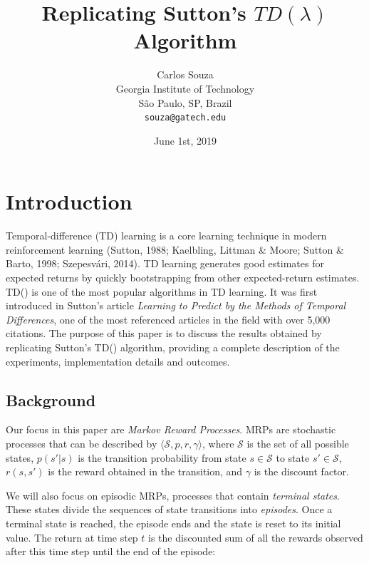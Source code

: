 \documentclass{article}
\title{Replicating Sutton's $TD(\lambda)$ Algorithm}
\date{June 1st, 2019}	%
\author{
  Carlos Souza\\
  Georgia Institute of Technology\\
  São Paulo, SP, Brazil \\
  \texttt{souza@gatech.edu} \\
}
\begin{document}
\maketitle

\begin{abstract}
\lipsum[1]
\end{abstract}




\section{Introduction}
\label{sec:introduction}
Temporal-difference (TD) learning is a core learning technique in modern reinforcement learning  (Sutton, 1988; Kaelbling, Littman \& Moore; Sutton \& Barto, 1998; Szepesvári, 2014).
TD learning generates good estimates for expected returns by quickly bootstrapping from other expected-return estimates. TD(\textlambda) is one of the most popular algorithms in TD learning.
It was first introduced in Sutton's article \emph{Learning to Predict by the Methods of Temporal Differences}, one of the most referenced articles in the field with over 5,000 citations.
The purpose of this paper is to discuss the results obtained by replicating Sutton's TD(\textlambda) algorithm, providing a complete description of the experiments, implementation details and outcomes.

\subsection{Background}
\label{subsec:background}
Our focus in this paper are \emph{Markov Reward Processes}.
MRPs are stochastic processes that can be described by \(\langle\mathcal{S}, p, r, \gamma\rangle\), where \(\mathcal{S}\) is the set of all possible states, \(p(s'|s)\) is the transition probability from state \(s \in \mathcal{S}\) to state \(s' \in \mathcal{S}\), \(r(s, s')\) is the reward obtained in the transition, and \(\gamma\) is the discount factor.

We will also focus on episodic MRPs, processes that contain \emph{terminal states}.
These states divide the sequences of state transitions into \emph{episodes}.
Once a terminal state is reached, the episode ends and the state is reset to its initial value.
The return at time step \(t\) is the discounted sum of all the rewards observed after this time step until the end of the episode:
\end{document}
